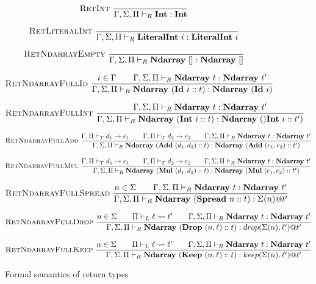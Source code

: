 \documentclass{report}
\begin{document}
\begin{figure}
    $$\textsc{RetInt}~\frac{}{\Gamma, \Sigma, \Pi \vdash_R \textbf{Int} : \textbf{Int}}$$

    $$\textsc{RetLiteralInt}~\frac{}{\Gamma, \Sigma, \Pi \vdash_R \textbf{LiteralInt}~i : \textbf{LiteralInt}~i}$$

    $$\textsc{RetNdarrayEmpty}~\frac{}{\Gamma, \Sigma, \Pi \vdash_R \textbf{Ndarray}~[] : \textbf{Ndarray}~[]}$$

    $$\textsc{RetNdarrayFullId}~\frac{i \in \Gamma \qquad \Gamma, \Sigma, \Pi \vdash_R \textbf{Ndarray}~t : \textbf{Ndarray}~t'}{\Gamma, \Sigma, \Pi \vdash_R \textbf{Ndarray}~(\textbf{Id}~i :: t) : \textbf{Ndarray}~(\textbf{Id}~i)}$$

    $$\textsc{RetNdarrayFullInt}~\frac{\Gamma, \Sigma, \Pi \vdash_R \textbf{Ndarray}~t : \textbf{Ndarray}~t'}{\Gamma, \Sigma, \Pi \vdash_R \textbf{Ndarray}~(\textbf{Int}~i :: t) : \textbf{Ndarray}~()\textbf{Int}~i :: t')}$$

    $$\textsc{RetNdarrayFullAdd}~\frac{\Gamma, \Pi \vdash_T d_1 \rightarrow e_1 \qquad \Gamma, \Pi \vdash_T d_2 \rightarrow e_2 \qquad \Gamma, \Sigma, \Pi \vdash_R \textbf{Ndarray}~t : \textbf{Ndarray}~t'}{\Gamma, \Sigma, \Pi \vdash_R \textbf{Ndarray}~(\textbf{Add}~(d_1, d_2) :: t) : \textbf{Ndarray}~(\textbf{Add}~(e_1, e_2) :: t')}$$

    $$\textsc{RetNdarrayFullMul}~\frac{\Gamma, \Pi \vdash_T d_1 \rightarrow e_1 \qquad \Gamma, \Pi \vdash_T d_2 \rightarrow e_2 \qquad \Gamma, \Sigma, \Pi \vdash_R \textbf{Ndarray}~t : \textbf{Ndarray}~t'}{\Gamma, \Sigma, \Pi \vdash_R \textbf{Ndarray}~(\textbf{Mul}~(d_1, d_2) :: t) : \textbf{Ndarray}~(\textbf{Mul}~(e_1, e_2) :: t')}$$

    $$\textsc{RetNdarrayFullSpread}~\frac{n \in \Sigma \qquad \Gamma, \Sigma, \Pi \vdash_R \textbf{Ndarray}~t : \textbf{Ndarray}~t'}{\Gamma, \Sigma, \Pi \vdash_R \textbf{Ndarray}~(\textbf{Spread}~n :: t) : \Sigma(n) @ t'}$$

    $$\textsc{RetNdarrayFullDrop}~\frac{n \in \Sigma \qquad \Pi \vdash_L \ell \rightsquigarrow \ell' \qquad \Gamma, \Sigma, \Pi \vdash_R \textbf{Ndarray}~t : \textbf{Ndarray}~t'}{\Gamma, \Sigma, \Pi \vdash_R \textbf{Ndarray}~(\textbf{Drop}~(n, \ell) :: t) : drop(\Sigma(n), \ell') @ t'}$$

    $$\textsc{RetNdarrayFullKeep}~\frac{n \in \Sigma \qquad \Pi \vdash_L \ell \rightsquigarrow \ell' \qquad \Gamma, \Sigma, \Pi \vdash_R \textbf{Ndarray}~t : \textbf{Ndarray}~t'}{\Gamma, \Sigma, \Pi \vdash_R \textbf{Ndarray}~(\textbf{Keep}~(n, \ell) :: t) : keep(\Sigma(n), \ell') @ t'}$$
    \caption{Formal semantics of return types}
    \label{semantics:ret}
\end{figure}
\end{document}
